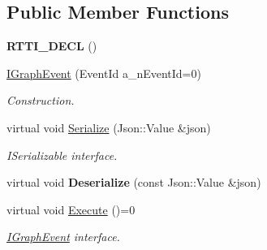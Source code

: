\subsection*{Public Member Functions}
\begin{DoxyCompactItemize}
\item 
\mbox{\label{struct_graph_connector_1_1_i_graph_event_a9f61ca574bb0181620c5c63cea35fb23}} 
{\bfseries R\+T\+T\+I\+\_\+\+D\+E\+CL} ()
\item 
\mbox{\label{struct_graph_connector_1_1_i_graph_event_ae9fa0cc47f37c7393f0866b826aee634}} 
\hyperlink{struct_graph_connector_1_1_i_graph_event_ae9fa0cc47f37c7393f0866b826aee634}{I\+Graph\+Event} (Event\+Id a\+\_\+n\+Event\+Id=0)
\begin{DoxyCompactList}\small\item\em Construction. \end{DoxyCompactList}\item 
\mbox{\label{struct_graph_connector_1_1_i_graph_event_afc63dc09792065e27feab3423617fbd4}} 
virtual void \hyperlink{struct_graph_connector_1_1_i_graph_event_afc63dc09792065e27feab3423617fbd4}{Serialize} (Json\+::\+Value \&json)
\begin{DoxyCompactList}\small\item\em I\+Serializable interface. \end{DoxyCompactList}\item 
\mbox{\label{struct_graph_connector_1_1_i_graph_event_a34e3df76de670b2d3f83f1d4ee04e5bc}} 
virtual void {\bfseries Deserialize} (const Json\+::\+Value \&json)
\item 
\mbox{\label{struct_graph_connector_1_1_i_graph_event_aa9da1cab9f3bd7b0c5a6c8f5097d93d2}} 
virtual void \hyperlink{struct_graph_connector_1_1_i_graph_event_aa9da1cab9f3bd7b0c5a6c8f5097d93d2}{Execute} ()=0
\begin{DoxyCompactList}\small\item\em \hyperlink{struct_graph_connector_1_1_i_graph_event}{I\+Graph\+Event} interface. \end{DoxyCompactList}\end{DoxyCompactItemize}
